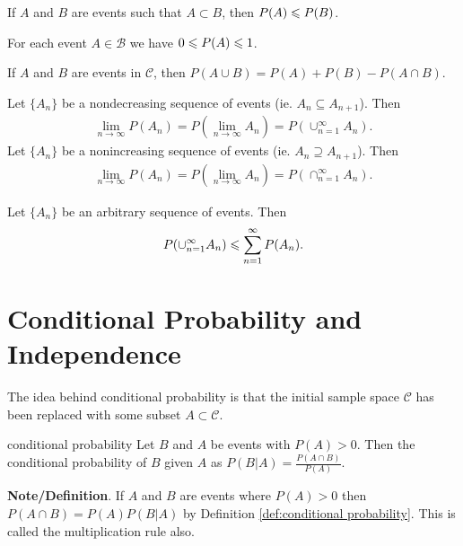 \begin{theorem}{}{}
    If $A$ and $B$ are events such that $A\subset B$,
    then $P(A)\leqslant P(B)$.
\end{theorem}

\begin{theorem}{}{}
    For each event $A\in\mathcal{B}$ we have $0\leqslant P(A)\leqslant 1$.
\end{theorem}

\begin{theorem}{}{}
    If $A$ and $B$ are events in $\mathcal{C}$,
    then $P(A\cup B)=P(A)+P(B)-P(A\cap B)$.
\end{theorem}

\begin{theorem}{}{}
    Let $\{A_n\}$ be a nondecreasing sequence of events (ie. $A_n\subseteq A_{n+1}$). Then
    \begin{align*}
        \lim_{n\rightarrow \infty} P(A_n)=P(\lim_{n\rightarrow \infty}A_n)=P(\cup_{n=1}^{\infty}A_n).
    \end{align*}
    Let $\{A_n\}$ be a nonincreasing sequence of events (ie. $A_n\supseteq A_{n+1}$). Then
    \begin{align*}
        \lim_{n\rightarrow \infty} P(A_n)=P(\lim_{n\rightarrow \infty}A_n)=P(\cap_{n=1}^{\infty}A_n).
    \end{align*}
\end{theorem}

\begin{theorem}{}{}
    Let $\{A_n\}$ be an arbitrary sequence of events. Then
    \begin{align*}
        P(\cup_{n=1}^{\infty}A_n)\leqslant \sum\limits_{n=1}^{\infty}P(A_n).
    \end{align*}
\end{theorem}

\section{Conditional Probability and Independence}
The idea behind conditional probability is that the initial sample space $\mathcal{C}$
has been replaced with some subset $A\subset \mathcal{C}$.

\begin{definition}{}{conditional probability}
    Let $B$ and $A$ be events with $P(A)>0$.
    Then the conditional probability of $B$ given $A$ as $P(B|A)=\frac{P(A\cap B)}{P(A)}$.
\end{definition}

\textbf{Note/Definition}. If $A$ and $B$ are events where $P(A)>0$ then 
$P(A\cap B)=P(A)P(B|A)$ by Definition \ref{def:conditional probability}.
This is called the multiplication rule also.

